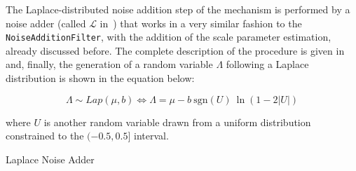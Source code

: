 The Laplace-distributed noise addition step of the mechanism is performed by a noise adder (called $\mathcal{L}$ in~) that works in a very similar fashion to the \texttt{NoiseAdditionFilter}, with the addition of the scale parameter estimation, already discussed before. The complete description of the procedure is given in~ and, finally, the generation of a random variable $\Lambda$ following a Laplace distribution is shown in the equation below:

\begin{equation}
\Lambda \sim Lap(\mu,b) \iff \Lambda = \mu - b~\mathrm{sgn}(U)~\ln(1-2\vert U \vert)
\end{equation}

where $U$ is another random variable drawn from a uniform distribution constrained to the $(-0.5,0.5]$ interval.

\begin{algorithm}
\caption{Laplace Noise Adder\label{al:laplace-noise-adder}}
\end{algorithm}